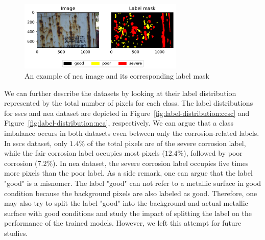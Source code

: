 \documentclass[mathematics,article,submit,pdftex,moreauthors]{Definitions/mdpi}
\begin{document}
\begin{figure}[htbp]
    \begin{center}
    \includegraphics[width=0.7\textwidth]{figures/nea-example.pdf}
    \caption{An example of \ac{nea} image and its corresponding label mask}
    \label{fig:dataset:nea-example}
    \end{center}
\end{figure}

We can further describe the datasets by looking at their label
distribution represented by the total number of pixels for each 
class. The label distributions for \ac{sscs} and \ac{nea}
dataset are depicted in Figure~\ref{fig:label-distribution:ccsc}
and Figure~\ref{fig:label-distribution:nea}, respectively.
We can argue that a class imbalance occurs in both datasets
even between only the corrosion-related labels. In \ac{sscs}
dataset, only $1.4\%$ of the total pixels are of the severe
corrosion label, while the fair corrosion label occupies
most pixels ($12.4\%$), followed by poor corrosion ($7.2\%$).
In \ac{nea} dataset, the severe corrosion label occupies
five times more pixels than the poor label. As a side remark,
one can argue that the label "good" is a misnomer. The 
label "good" can not refer to a metallic surface in good 
condition because the background pixels are also labeled as good.
Therefore, one may also try to split the label "good" into
the background and actual metallic surface with good conditions
and study the impact of splitting the label on the performance
of the trained models. However, we left this attempt for future studies.
\end{document}
